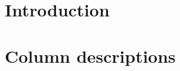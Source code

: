 \section{Introduction}                   \label{rlp auth: intro}                           
\section{Column descriptions}            \label{rlp auth: column descriptions}             
